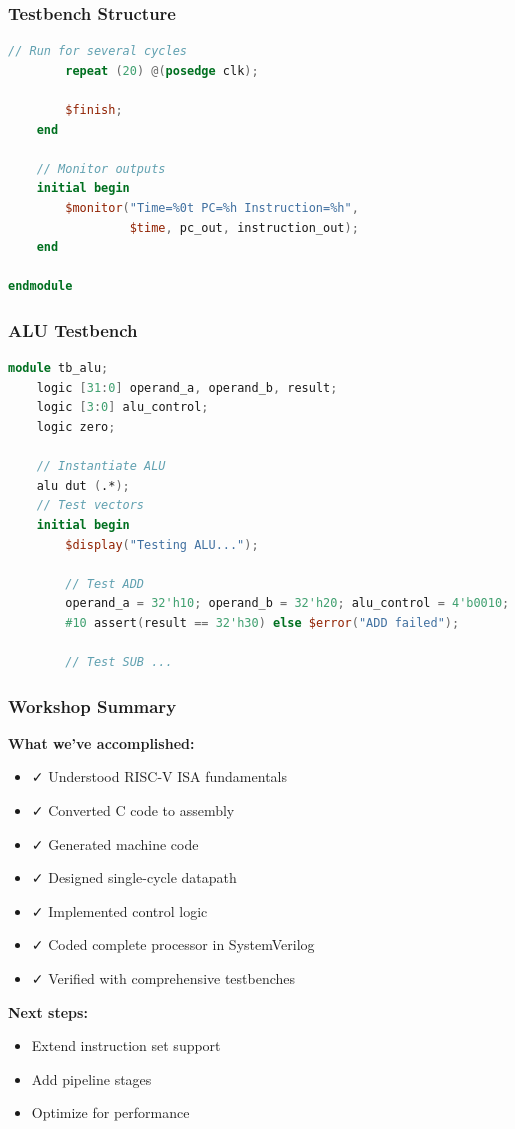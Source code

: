 \documentclass[aspectratio=169,xcolor=dvipsnames]{beamer}
\begin{document}
\begin{frame}[fragile]
\frametitle{Testbench Structure}
\begin{lstlisting}[language=Verilog]
        // Run for several cycles
        repeat (20) @(posedge clk);

        $finish;
    end

    // Monitor outputs
    initial begin
        $monitor("Time=%0t PC=%h Instruction=%h",
                 $time, pc_out, instruction_out);
    end

endmodule
\end{lstlisting}
\end{frame}



\begin{frame}[fragile]
\frametitle{ALU Testbench}
\begin{lstlisting}[language=Verilog]
module tb_alu;
    logic [31:0] operand_a, operand_b, result;
    logic [3:0] alu_control;
    logic zero;

    // Instantiate ALU
    alu dut (.*);
    // Test vectors
    initial begin
        $display("Testing ALU...");

        // Test ADD
        operand_a = 32'h10; operand_b = 32'h20; alu_control = 4'b0010;
        #10 assert(result == 32'h30) else $error("ADD failed");

        // Test SUB ...
\end{lstlisting}
\end{frame}


\begin{frame}
\frametitle{Workshop Summary}
\textbf{What we've accomplished:}
\begin{itemize}
    \item ✓ Understood RISC-V ISA fundamentals
    \item ✓ Converted C code to assembly
    \item ✓ Generated machine code
    \item ✓ Designed single-cycle datapath
    \item ✓ Implemented control logic
    \item ✓ Coded complete processor in SystemVerilog
    \item ✓ Verified with comprehensive testbenches
\end{itemize}

\vspace{1em}
\textbf{Next steps:}
\begin{itemize}
    \item Extend instruction set support
    \item Add pipeline stages
    \item Optimize for performance
\end{itemize}
\end{frame}
\end{document}
